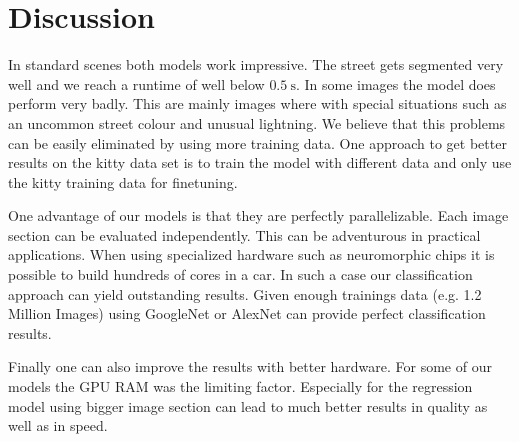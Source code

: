 
\section{Discussion}\label{sec:discussion}

In standard scenes both models work impressive. The street gets segmented very well and we reach a runtime of well below  $\SI{0.5}{\second}$. In some images the model does perform very badly. This are mainly images where with special situations such as an uncommon street colour and unusual lightning. We believe that this problems can be easily eliminated by using more training data. One approach to get better results on the kitty data set is to train the model with different data and only use the kitty training data for finetuning. 

One advantage of our models is that they are perfectly parallelizable. Each  image section can be evaluated independently. This can be adventurous in practical applications. When using specialized hardware such as neuromorphic chips it is possible to build hundreds of cores in a car. In such a case our classification approach can yield outstanding results. Given enough trainings data (e.g. 1.2 Million Images) using GoogleNet or AlexNet can provide perfect classification results.

Finally one can also improve the results with better hardware. For some of our models the GPU RAM was the limiting factor. Especially for the regression model using bigger image section can lead to much better results in quality as well as in speed.

